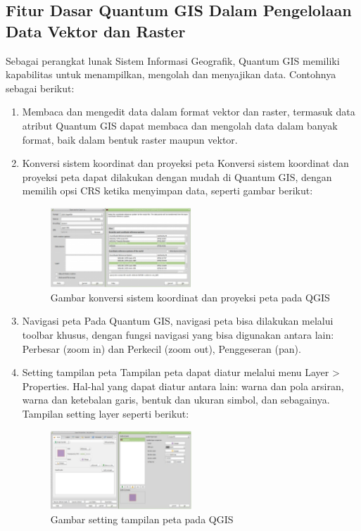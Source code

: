 \subsection{Fitur Dasar Quantum GIS Dalam Pengelolaan Data Vektor dan Raster}
Sebagai perangkat lunak Sistem Informasi Geografik, Quantum GIS memiliki kapabilitas untuk menampilkan, mengolah dan menyajikan data. Contohnya sebagai berikut:
\begin{enumerate}
\item
Membaca dan mengedit data dalam format vektor dan raster, termasuk data atribut
Quantum GIS dapat membaca dan mengolah data dalam banyak format, baik dalam bentuk raster maupun vektor.
\item
Konversi sistem koordinat dan proyeksi peta
Konversi sistem koordinat dan proyeksi peta dapat dilakukan dengan mudah di Quantum GIS, dengan memilih opsi CRS ketika menyimpan data, seperti gambar berikut:
\begin{figure}[ht]
    \centerline{\includegraphics[width=0.5\textwidth]{figures/proyeksi}}
    \caption{Gambar konversi sistem koordinat dan proyeksi peta pada QGIS}
    \label{proyeksi}
    \end{figure}
\item
Navigasi peta
Pada Quantum GIS, navigasi peta bisa dilakukan melalui toolbar khusus, dengan fungsi navigasi yang bisa digunakan antara lain: Perbesar (zoom in) dan Perkecil (zoom out), Penggeseran (pan).
\item
Setting tampilan peta
Tampilan peta dapat diatur melalui menu Layer > Properties. Hal-hal yang dapat diatur antara lain: warna dan pola arsiran, warna dan ketebalan garis, bentuk dan ukuran simbol, dan sebagainya. Tampilan setting layer seperti berikut:
\begin{figure}[ht]
    \centerline{\includegraphics[width=0.5\textwidth]{figures/setting}}
    \caption{Gambar setting tampilan peta pada QGIS}
    \label{setting}
    \end{figure}
\end{enumerate}

